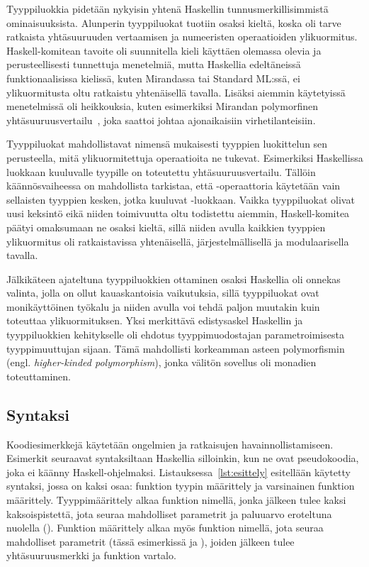 \documentclass[finnish]{tktltiki2}
\begin{document}
Tyyppiluokkia pidetään nykyisin yhtenä Haskellin tunnusmerkillisimmistä ominaisuuksista. Alunperin
tyyppiluokat tuotiin osaksi kieltä, koska oli tarve ratkaista yhtäsuuruuden vertaamisen ja
numeeristen operaatioiden ylikuormitus. Haskell-komitean tavoite oli suunnitella kieli käyttäen
olemassa olevia ja perusteellisesti tunnettuja menetelmiä, mutta Haskellia edeltäneissä
funktionaalisissa kielissä, kuten Mirandassa tai Standard ML:ssä, ei ylikuormitusta oltu ratkaistu
yhtenäisellä tavalla. Lisäksi aiemmin käytetyissä menetelmissä oli heikkouksia, kuten esimerkiksi
Mirandan polymorfinen yhtäsuuruusvertailu~, joka saattoi johtaa ajonaikaisiin
virhetilanteisiin.

Tyyppiluokat mahdollistavat nimensä mukaisesti tyyppien luokittelun sen perusteella, mitä
ylikuormitettuja operaatioita ne tukevat. Esimerkiksi Haskellissa luokkaan  kuuluvalle
tyypille on toteutettu yhtäsuuruusvertailu. Tällöin käännösvaiheessa on mahdollista tarkistaa, että
\code{==}-operaattoria käytetään vain sellaisten tyyppien kesken, jotka kuuluvat
-luokkaan. Vaikka tyyppiluokat olivat uusi keksintö eikä niiden toimivuutta oltu
todistettu aiemmin, Haskell-komitea päätyi omaksumaan ne osaksi kieltä, sillä niiden avulla kaikkien
tyyppien ylikuormitus oli ratkaistavissa yhtenäisellä, järjestelmällisellä ja modulaarisella
tavalla.

Jälkikäteen ajateltuna tyyppiluokkien ottaminen osaksi Haskellia oli onnekas valinta,
jolla on ollut kauaskantoisia vaikutuksia, sillä tyyppiluokat ovat monikäyttöinen työkalu ja niiden
avulla voi tehdä paljon muutakin kuin toteuttaa ylikuormituksen. Yksi merkittävä edistysaskel
Haskellin ja tyyppiluokkien kehitykselle oli ehdotus tyyppimuodostajan parametroimisesta
tyyppimuuttujan sijaan. Tämä mahdollisti korkeamman asteen polymorfismin (engl. \emph{higher-kinded
polymorphism}), jonka välitön sovellus oli monadien toteuttaminen.

\subsection{Syntaksi}

Koodiesimerkkejä käytetään ongelmien ja ratkaisujen havainnollistamiseen. Esimerkit seuraavat
syntaksiltaan Haskellia silloinkin, kun ne ovat pseudokoodia, joka ei käänny Haskell-ohjelmaksi.
Listauksessa~\ref{lst:esittely} esitellään käytetty syntaksi, jossa on kaksi osaa: funktion tyypin
määrittely ja varsinainen funktion määrittely. Tyyppimäärittely alkaa funktion nimellä, jonka
jälkeen tulee kaksi kaksoispistettä, jota seuraa mahdolliset parametrit ja paluuarvo eroteltuna
nuolella (\code{->}). Funktion määrittely alkaa myös funktion nimellä, jota seuraa mahdolliset
parametrit (tässä esimerkissä  ja ), joiden jälkeen tulee yhtäsuuruusmerkki ja
funktion vartalo.
\end{document}
